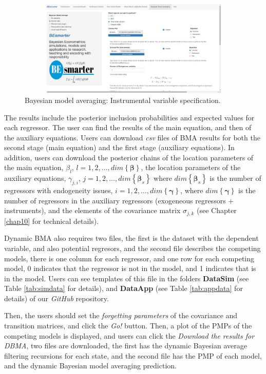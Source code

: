 \begin{figure}
	\includegraphics[width=340pt, height=130pt]{Chapters/chapterGUI/figures/Figure10.jpg}
	\caption[List of figure caption goes here]{Bayesian model averaging: Instrumental variable specification.}\label{fig610}
\end{figure} 

The results include the posterior inclusion probabilities and expected values for each regressor. The user can find the results of the main equation, and then of the auxiliary equations. Users can download \textit{csv} files of BMA results for both the second stage (main equation)  and the first stage (auxiliary equations). In addition, users can download the posterior chains of the location parameters of the main equation, $\beta_{l}$, $l=1,2,\dots,dim\left\{\bm{\beta}\right\}$, the location parameters of the auxiliary equations, $\gamma_{j,i}$, $j=1,2,\dots,dim\left\{\bm{\beta}_s\right\}$ where $dim\left\{\bm{\beta}_s\right\}$ is the number of regressors with endogeneity issues, $i=1,2,\dots,dim\left\{\bm{\gamma}\right\}$, where $dim\left\{\bm{\gamma}\right\}$ is the number of regressors in the auxiliary regressors (exogeneous regressors + instruments), and the elements of the covariance matrix $\sigma_{j,k}$ (see Chapter \ref{chap10} for technical details).

Dynamic BMA also requires two files, the first is the dataset with the dependent variable, and also potential regresors, and the second file describes the competing models, there is one column for each regressor, and one row for each competing model, 0 indicates that the regressor is not in the model, and 1 indicates that is in the model. Users can see templates of this file in the folders \textbf{DataSim} (see Table \ref{tab:simdata} for details), and \textbf{DataApp} (see Table \ref{tab:appdata} for details) of our \textit{GitHub} repository.

Then, the users should set the \textit{forgetting parameters} of the covariance and transition matrices, and click the \textit{Go!} button. Then, a plot of the PMPs of the competing models is displayed, and users can click the \textit{Download the results for DBMA}, two files are downloaded, the first has the dynamic Bayesian average filtering recursions for each state, and the second file has the PMP of each model, and the dynamic Bayesian model averaging prediction.  

